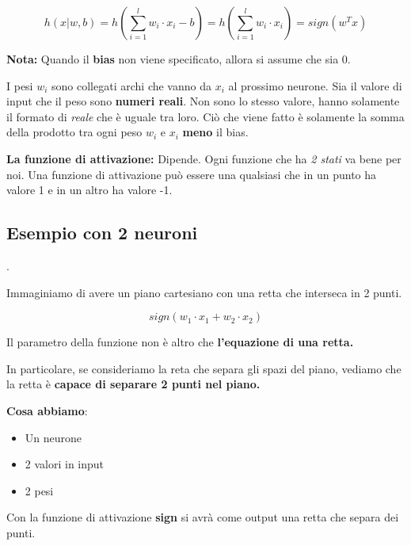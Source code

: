 \begin{equation}
    h(x|w,b) = h(\sum_{i=1}^l w_i\cdot x_i -b) = h(\sum_{i=1}^l w_i\cdot x_i) = \textit{sign}(w^Tx)
\end{equation}

\textbf{Nota:} Quando il \textbf{bias} non viene specificato, allora
si assume che sia 0.

I pesi $w_i$ sono collegati archi che vanno da $x_i$ al prossimo neurone. Sia
il valore di input che il peso sono \textbf{numeri reali}. Non sono lo stesso
valore, hanno solamente il formato di \textit{reale} che è uguale tra loro. Ciò
che viene fatto è solamente la somma della prodotto tra ogni peso $w_i$ e $x_i$
\textbf{meno} il bias.

\textbf{La funzione di attivazione:} Dipende. Ogni funzione che ha \textit{2 stati} va bene per noi. Una funzione di attivazione può essere una qualsiasi che in un
punto ha valore 1 e in un altro ha valore -1.

\subsection{Esempio con 2 neuroni}.

Immaginiamo di avere un piano cartesiano con una retta che interseca in 2
punti.

\begin{equation}
    sign(w_1\cdot x_1 + w_2\cdot x_2)
\end{equation}

Il parametro della funzione non è altro che \textbf{l'equazione di una retta.}

In particolare, se consideriamo la reta che separa gli spazi del piano, vediamo
che la retta è \textbf{capace di separare 2 punti nel piano.}

\textbf{Cosa abbiamo}:
\begin{itemize}
    \item Un neurone
    \item 2 valori in input
    \item 2 pesi
\end{itemize}

Con la funzione di attivazione \textbf{sign} si avrà come output una retta che
separa dei punti.

